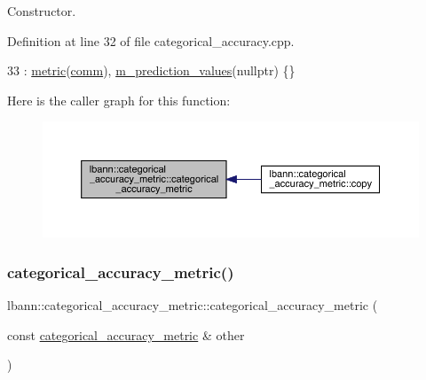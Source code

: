 Constructor. 

Definition at line 32 of file categorical\+\_\+accuracy.\+cpp.


\begin{DoxyCode}
33   : \hyperlink{classlbann_1_1metric_a3cd2d4f7dcbf94f70b3b8560a3171d9d}{metric}(\hyperlink{file__io_8cpp_ab048c6f9fcbcfaa57ce68b00263dbebe}{comm}), \hyperlink{classlbann_1_1categorical__accuracy__metric_a796e50da721050d30e0cea709484154e}{m\_prediction\_values}(\textcolor{keyword}{nullptr}) \{\}
\end{DoxyCode}
Here is the caller graph for this function\+:\nopagebreak
\begin{figure}[H]
\begin{center}
\leavevmode
\includegraphics[width=350pt]{classlbann_1_1categorical__accuracy__metric_ae7ea6f472bd6375780c49277742af9dc_icgraph}
\end{center}
\end{figure}
\mbox{\label{classlbann_1_1categorical__accuracy__metric_a42d38fbdadc86de653cb5b251cf01eb7}} 
\subsubsection{\texorpdfstring{categorical\+\_\+accuracy\+\_\+metric()}{categorical\_accuracy\_metric()}\hspace{0.1cm}{\footnotesize\ttfamily [2/2]}}
{\footnotesize\ttfamily lbann\+::categorical\+\_\+accuracy\+\_\+metric\+::categorical\+\_\+accuracy\+\_\+metric (\begin{DoxyParamCaption}\item[{const \hyperlink{classlbann_1_1categorical__accuracy__metric}{categorical\+\_\+accuracy\+\_\+metric} \&}]{other }\end{DoxyParamCaption})}

